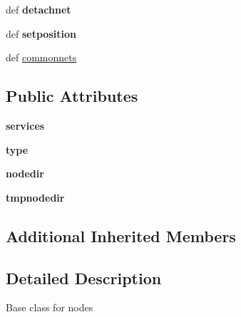 \begin{DoxyCompactItemize}
\item 
\hypertarget{classcore_1_1coreobj_1_1_py_core_node_a363adb50c3eefdbdc48a349739cc1581}{def {\bfseries detachnet}}\label{classcore_1_1coreobj_1_1_py_core_node_a363adb50c3eefdbdc48a349739cc1581}

\item 
\hypertarget{classcore_1_1coreobj_1_1_py_core_node_af3edfb039694c9660d688c1fd7b80605}{def {\bfseries setposition}}\label{classcore_1_1coreobj_1_1_py_core_node_af3edfb039694c9660d688c1fd7b80605}

\item 
def \hyperlink{classcore_1_1coreobj_1_1_py_core_node_ad69727ebdbfb83b6e3e16ea3c4598980}{commonnets}
\end{DoxyCompactItemize}
\subsection*{Public Attributes}
\begin{DoxyCompactItemize}
\item 
\hypertarget{classcore_1_1coreobj_1_1_py_core_node_a8cdbe9c5d086a311083d48ec3128216a}{{\bfseries services}}\label{classcore_1_1coreobj_1_1_py_core_node_a8cdbe9c5d086a311083d48ec3128216a}

\item 
\hypertarget{classcore_1_1coreobj_1_1_py_core_node_af21dedcbd9f8d07eefe177dcdb6dcd5e}{{\bfseries type}}\label{classcore_1_1coreobj_1_1_py_core_node_af21dedcbd9f8d07eefe177dcdb6dcd5e}

\item 
\hypertarget{classcore_1_1coreobj_1_1_py_core_node_ad7c4938d76c9a632e754bf5067c8edb8}{{\bfseries nodedir}}\label{classcore_1_1coreobj_1_1_py_core_node_ad7c4938d76c9a632e754bf5067c8edb8}

\item 
\hypertarget{classcore_1_1coreobj_1_1_py_core_node_a783b98ac1d76a30bb930c5494221af42}{{\bfseries tmpnodedir}}\label{classcore_1_1coreobj_1_1_py_core_node_a783b98ac1d76a30bb930c5494221af42}

\end{DoxyCompactItemize}
\subsection*{Additional Inherited Members}


\subsection{Detailed Description}
\begin{DoxyVerb}Base class for nodes
\end{DoxyVerb}
 

